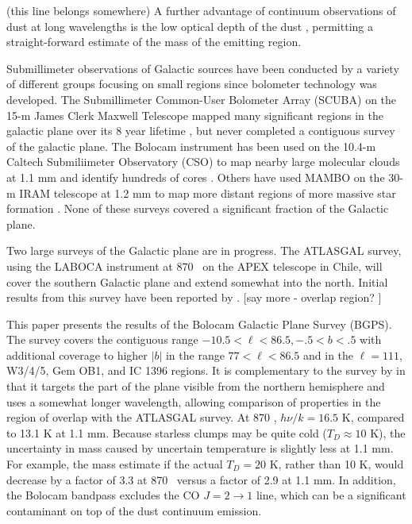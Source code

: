 \documentclass[12pt,preprint]{aastex}
\newcommand{\td}{\mbox{$T_D$}}
\newcommand{\jj}[2]{\mbox{$J = #1\rightarrow#2$}}
\newcommand{\lon}{\ensuremath{\ell}}
\begin{document}
(this line belongs somewhere)
A further advantage of continuum observations of dust at long wavelengths
is the low optical depth of the dust \citep{johnstone06},
permitting a straight-forward estimate of the mass of the emitting region.

Submillimeter observations of Galactic sources have been conducted by
a variety of different groups focusing on small regions since
bolometer technology was developed.  The Submillimeter Common-User
Bolometer Array (SCUBA) on the 15-m James Clerk Maxwell Telescope
mapped many significant regions in the galactic plane over its 8 year
lifetime \citep{holland99,difrancesco08}, but never completed a
contiguous survey of the galactic plane.  The Bolocam instrument has been
used on the 10.4-m Caltech Submiliimeter Observatory (CSO) to map nearby large
molecular clouds at 1.1 mm and identify hundreds of cores \citep{enoch06}.
Others have used MAMBO on the 30-m IRAM telescope at 1.2 mm to map
more distant regions of more massive star formation \citep{motte07}.
None of these surveys covered a significant fraction of the Galactic plane.

Two large surveys of the Galactic plane are in progress.
The ATLASGAL survey, using the LABOCA instrument at 870 \micron\
on the APEX telescope in Chile, will cover the southern Galactic plane
and extend somewhat into the north. Initial results from this survey
have been reported by \citet{schuller09}. [say more - overlap region?
]

This paper presents the results of the Bolocam Galactic Plane Survey (BGPS).
The survey covers the contiguous range $-10.5 < \lon < 86.5, -.5 < b < .5$ with
additional coverage to higher $|b|$ in the range $77 < \lon < 86.5$ and in the
$\lon=111$, W3/4/5, Gem OB1, and IC 1396 regions.  It is complementary to the
survey by \citet{schuller09} in that it targets the part of the plane visible
from the northern hemisphere and uses a somewhat longer wavelength, allowing
comparison of properties in the region of overlap with the ATLASGAL survey.
At 870 \micron, $h\nu/k = 16.5$ K, compared to 13.1 K at 1.1 mm.  Because
starless clumps may be quite cold ($\td \approx 10$ K), the uncertainty in mass
caused by uncertain temperature is slightly less at 1.1 mm.  For example, the
mass estimate if the actual $\td = 20$ K, rather than 10 K, would decrease by a
factor of 3.3 at 870 \micron\ versus a factor of 2.9 at 1.1 mm. In addition,
the Bolocam bandpass excludes the CO \jj{2}{1} line, which can be a significant
contaminant on top of the dust continuum emission.
\end{document}
